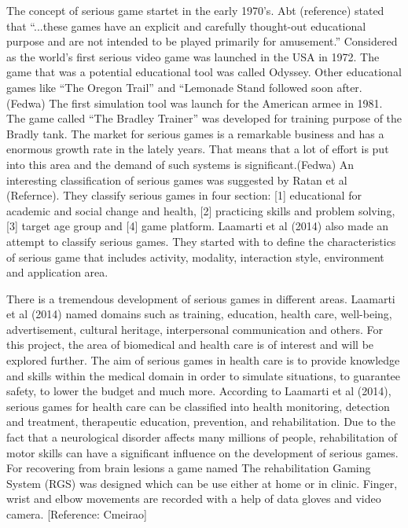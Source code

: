 The concept of serious game startet in the early 1970’s. Abt (reference) stated that “...these games have an explicit and carefully thought-out educational purpose and are not intended to be played primarily for amusement.”
Considered as the  world’s first serious video game was launched in the USA in 1972. The game that was a potential educational tool was called Odyssey. Other educational games like “The Oregon Trail” and “Lemonade Stand followed soon after. (Fedwa)
The first simulation tool was launch for the American armee in 1981.  The game called “The Bradley Trainer” was developed for training purpose of the Bradly tank.
The market for serious games is a remarkable business and has a enormous growth rate in the lately years. That means that a lot of effort is put into this area and the demand of such systems is significant.(Fedwa)
An interesting classification of serious games was suggested by Ratan et al (Refernce). They classify serious games in four section: [1] educational for academic and social change and health, [2] practicing skills and problem solving, [3] target age group and [4] game platform.
Laamarti et al (2014) also made an attempt to classify serious games. They started with to define the characteristics of serious game that includes activity, modality, interaction style, environment and application area. 

There is a tremendous development of serious games in different areas. Laamarti et al (2014) named domains such as training, education, health care, well-being, advertisement, cultural heritage,  interpersonal communication and others. 
For this project, the area of  biomedical and health care is of interest and will be explored further. The aim of  serious games in health care is to provide knowledge and skills within the medical domain in order to simulate situations, to guarantee safety, to lower the budget and much more. According to Laamarti et al (2014),  serious games for health care can be classified into health monitoring, detection and treatment, therapeutic education, prevention, and rehabilitation. Due to the fact that a neurological disorder affects many millions of people,  rehabilitation of motor skills can have a significant influence on the development of serious games. For recovering from brain lesions a game named The rehabilitation Gaming System (RGS) was designed which can be use either at home or in clinic. Finger, wrist and elbow  movements are recorded with a help of data gloves and video camera.  [Reference: Cmeirao]

